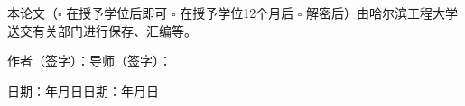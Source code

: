 {{    本论文（$\square$ 在授予学位后即可 \quad  $\square$ 在授予学位12个月后 \quad  $\square$ 解密后）由哈尔滨工程大学送交有关部门进行保存、汇编等。

    \vspace{1.0cm}
    \hspace{1.0cm}作者（签字）：\hspace{4.5cm}导师（签字）：\hfill

    \vspace{0.5cm}
    \hspace{1.0cm}日期：\hspace{1.0cm}年\hspace{0.8cm}月\hspace{0.8cm}日\hspace{2.2cm}日期：\hspace{1.0cm}年\hspace{0.8cm}月\hspace{0.8cm}日
    }
}
